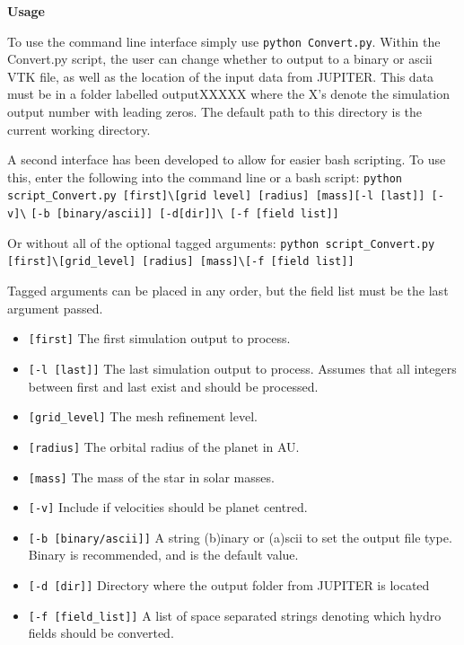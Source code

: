 \documentclass[preprint2]{aastex62}
\begin{document}
\textbf{Usage}

To use the command line interface simply use \verb|python Convert.py|.
Within the Convert.py script, the user can change whether to output to a binary or ascii VTK file, as well as the location of the input data from JUPITER. This data must be in a folder labelled outputXXXXX where the X's denote the simulation output number with leading zeros. The default path to this directory is the current working directory.

A second interface has been developed to allow for easier bash scripting. To use this, enter the following into the command line or a bash script:
\verb|python script_Convert.py [first]\|\newline \verb|[grid level] [radius] [mass]|\newline \verb|[-l [last]] [-v]\| \newline \verb|[-b [binary/ascii]] [-d[dir]]\ |\newline\verb|[-f [field list]]|

Or without all of the optional tagged arguments:\newline
\verb|python script_Convert.py [first]\|\newline \verb|[grid_level] [radius] [mass]\|\newline \verb|[-f [field list]]|

Tagged arguments can be placed in any order, but the field list must be the last argument passed.
\begin{itemize}
	\item \verb|[first]| The first simulation output to process.
	\item \verb|[-l [last]]| The last simulation output to process. Assumes that all integers between first and last exist and should be processed.
	\item \verb|[grid_level]| The mesh refinement level.
	\item \verb|[radius]| The orbital radius of the planet in AU.
	\item \verb|[mass]| The mass of the star in solar masses.
	\item \verb|[-v]| Include if velocities should be planet centred. 
	\item \verb|[-b [binary/ascii]]| A string (b)inary or (a)scii to set the output file type. Binary is recommended, and is the default value.
	\item \verb|[-d [dir]]| Directory where the output folder from JUPITER is located
	\item \verb|[-f [field_list]]| A list of space separated strings denoting which hydro fields should be converted.
\end{itemize}
\end{document}
